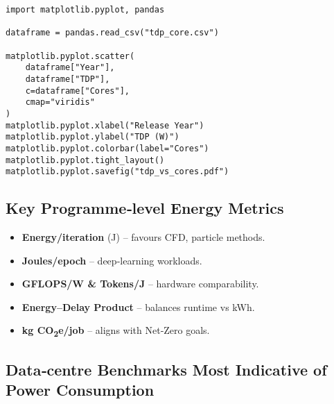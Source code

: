 

\begin{lstlisting}[style=pystyle,
       basicstyle=\sffamily\footnotesize,
       xleftmargin=2em, xrightmargin=1em,
                   caption={Python script that produces
                            Fig.~\ref{fig:tdp_scatter}.},
                   label={lst:tdp_py}]
import matplotlib.pyplot, pandas

dataframe = pandas.read_csv("tdp_core.csv")

matplotlib.pyplot.scatter(
    dataframe["Year"],
    dataframe["TDP"],
    c=dataframe["Cores"],
    cmap="viridis"
)
matplotlib.pyplot.xlabel("Release Year")
matplotlib.pyplot.ylabel("TDP (W)")
matplotlib.pyplot.colorbar(label="Cores")
matplotlib.pyplot.tight_layout()
matplotlib.pyplot.savefig("tdp_vs_cores.pdf")
\end{lstlisting}

\subsection{Key Programme‑level Energy Metrics}


\begin{itemize}
  \item \textbf{Energy/iteration} (J) – favours CFD, particle methods.
  \item \textbf{Joules/epoch} – deep‑learning workloads.
  \item \textbf{GFLOPS/W \& Tokens/J} – hardware comparability.
  \item \textbf{Energy–Delay Product} – balances runtime vs kWh.
  \item \textbf{kg CO\textsubscript{2}e/job} – aligns with Net‑Zero goals.
\end{itemize}

\subsection{Data‑centre Benchmarks Most Indicative of Power Consumption}

